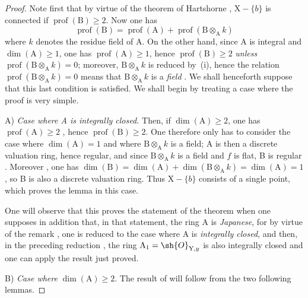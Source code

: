\begin{proof}
Note first that by virtue of the theorem of Hartshorne , $\mathrm{X}-\{b\}$ is connected if $\operatorname{prof}(\mathrm{B})\geq 2$.
Now one has 
\begin{equation}
  \operatorname{prof}(\mathrm{B})=\operatorname{prof}(\mathrm{A})+\operatorname{prof}(\mathrm{B}\otimes_{\mathrm{A}}k)
  \tag{18.9.7.4}
\end{equation}
where $k$ denotes the residue field of A.
On the other hand, since A is integral and $\dim(\mathrm{A})\geq 1$, one has $\operatorname{prof}(\mathrm{A})\geq 1$, hence $\operatorname{prof}(\mathrm{B})\geq 2$ \emph{unless} $\operatorname{prof}(\mathrm{B}\otimes_{\mathrm{A}}k)=0$;
moreover, $\mathrm{B}\otimes_{\mathrm{A}}k$ is reduced by~(i), hence the relation $\operatorname{prof}(\mathrm{B}\otimes_{\mathrm{A}}k)=0$ means that $\mathrm{B}\otimes_{\mathrm{A}}k$ is a \emph{field} .
We shall henceforth suppose that this last condition is satisfied.
We shall begin by treating a case where the proof is very simple.

A) \emph{Case where A is integrally closed.}
Then, if $\dim(\mathrm{A})\geq 2$, one has $\operatorname{prof}(\mathrm{A})\geq 2$ , hence $\operatorname{prof}(\mathrm{B})\geq 2$.
One therefore only has to consider the case where $\dim(\mathrm{A})=1$ and where $\mathrm{B}\otimes_{\mathrm{A}}k$ is a field;
A is then a discrete valuation ring, hence regular, and since $\mathrm{B}\otimes_{\mathrm{A}}k$
is a field and $f$ is flat, B is regular .
Moreover , one has $\dim(\mathrm{B})=\dim(\mathrm{A})+\dim(\mathrm{B}\otimes_{\mathrm{A}}k)=\dim(\mathrm{A})=1$, so B is also a discrete valuation ring.
Thus $\mathrm{X}-\{b\}$ consists of a single point, which proves the lemma  in this case.

One will observe that this proves the statement of the theorem  when one supposes in addition that, in that statement, the ring A is \emph{Japanese}, for by virtue of the remark , one is reduced to the case where A is \emph{integrally closed}, and then, in the preceding reduction , the ring $\mathrm{A}_1=\sh{O}_{\mathrm{Y},y}$ is also integrally closed and one can apply the result just proved.

B) \emph{Case where} $\dim(\mathrm{A})\geq 2$.
The result of  will follow from the two following lemmas.
\end{proof}

